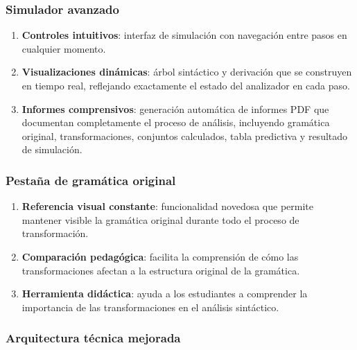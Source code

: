 \subsubsection{Simulador avanzado}

\begin{enumerate}
    \item \textbf{Controles intuitivos}: interfaz de simulación con navegación entre pasos en cualquier momento.

    \item \textbf{Visualizaciones dinámicas}: árbol sintáctico y derivación que se construyen en tiempo real, reflejando exactamente el estado del analizador en cada paso.

    \item \textbf{Informes comprensivos}: generación automática de informes PDF que documentan completamente el proceso de análisis, incluyendo gramática original, transformaciones, conjuntos calculados, tabla predictiva y resultado de simulación.
\end{enumerate}

\subsubsection{Pestaña de gramática original}

\begin{enumerate}
    \item \textbf{Referencia visual constante}: funcionalidad novedosa que permite mantener visible la gramática original durante todo el proceso de transformación.

    \item \textbf{Comparación pedagógica}: facilita la comprensión de cómo las transformaciones afectan a la estructura original de la gramática.

    \item \textbf{Herramienta didáctica}: ayuda a los estudiantes a comprender la importancia de las transformaciones en el análisis sintáctico.
\end{enumerate}

\subsubsection{Arquitectura técnica mejorada}

